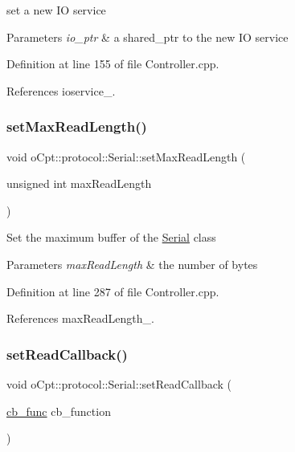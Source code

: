 set a new IO service 
\begin{DoxyParams}{Parameters}
{\em io\+\_\+ptr} & a shared\+\_\+ptr to the new IO service \\
\hline
\end{DoxyParams}


Definition at line 155 of file Controller.\+cpp.



References ioservice\+\_\+.

\hypertarget{classo_cpt_1_1protocol_1_1_serial_a7362cc03343981796a601014f5cd4d55}{}\label{classo_cpt_1_1protocol_1_1_serial_a7362cc03343981796a601014f5cd4d55} 
\subsubsection{\texorpdfstring{set\+Max\+Read\+Length()}{setMaxReadLength()}}
{\footnotesize\ttfamily void o\+Cpt\+::protocol\+::\+Serial\+::set\+Max\+Read\+Length (\begin{DoxyParamCaption}\item[{unsigned int}]{max\+Read\+Length }\end{DoxyParamCaption})}

Set the maximum buffer of the \hyperlink{classo_cpt_1_1protocol_1_1_serial}{Serial} class 
\begin{DoxyParams}{Parameters}
{\em max\+Read\+Length} & the number of bytes \\
\hline
\end{DoxyParams}


Definition at line 287 of file Controller.\+cpp.



References max\+Read\+Length\+\_\+.

\hypertarget{classo_cpt_1_1protocol_1_1_serial_ab86f007388ac73b97fdbf14921bc1e32}{}\label{classo_cpt_1_1protocol_1_1_serial_ab86f007388ac73b97fdbf14921bc1e32} 
\subsubsection{\texorpdfstring{set\+Read\+Callback()}{setReadCallback()}}
{\footnotesize\ttfamily void o\+Cpt\+::protocol\+::\+Serial\+::set\+Read\+Callback (\begin{DoxyParamCaption}\item[{\hyperlink{classo_cpt_1_1protocol_1_1_serial_ad55591180be8bea2fe3832b1265b7496}{cb\+\_\+func}}]{cb\+\_\+function }\end{DoxyParamCaption})}

